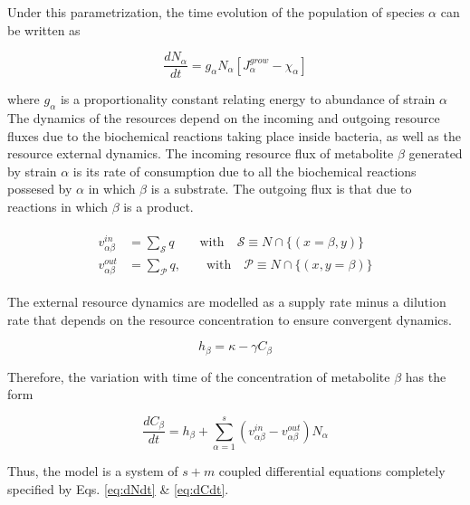 \documentclass[titlepage,11pt]{article}
\begin{document}
\begin{linenumbers}
\begin{singlespace}
				Under this parametrization, the time evolution of the population of species $ \alpha $ can be written as
				\begin{linenomath*}	
					\begin{equation}\label{eq:dNdt}
					\dfrac{dN_{\alpha}}{dt} = g_{\alpha}N_{\alpha}\left[J_{\alpha}^{grow}-\chi_{\alpha}\right] 
					\end{equation}
				\end{linenomath*}
				where $ g_{\alpha} $ is a proportionality constant relating energy to abundance of strain $ \alpha $\\
				The dynamics of the resources depend on the incoming and outgoing resource fluxes due to the biochemical reactions taking place inside bacteria, as well as the resource external dynamics. The incoming resource flux of metabolite $ \beta $  generated by strain $ \alpha $ is its rate of consumption due to all the biochemical reactions possesed by $ \alpha $ in which $ \beta $ is a substrate. The outgoing flux is that due to reactions in which $ \beta $ is a product.
				\begin{linenomath*}	
					\begin{align}
					\begin{split}
					v^{in}_{\alpha \beta} &= \sum_{\mathcal{S}} q   \qquad \textrm{with}  \quad  \mathcal{S} \equiv N \cap \{(x = \beta, y)\}\\
					v^{out}_{\alpha \beta} &= \sum_{\mathcal{P}} q , \qquad \textrm{with}  \quad  \mathcal{P} \equiv N \cap \{(x, y = \beta )\}
					\end{split}
					\end{align}
				\end{linenomath*}
				The external resource dynamics are modelled as a supply rate minus a dilution rate that depends on the resource concentration to ensure convergent dynamics. 
				\begin{linenomath*}	
					\begin{equation}
					h_{\beta}  =  \kappa - \gamma C_{\beta}
					\end{equation}
				\end{linenomath*}
				Therefore, the variation with time of the concentration of metabolite $ \beta $ has the form
				\begin{linenomath*}	
					\begin{equation}
					\dfrac{dC_{\beta}}{dt} = h_{\beta} + \sum_{{\alpha} = 1}^{s} \left(v_{{\alpha}\beta}^{in} -v_{{\alpha}\beta}^{out} \right)N_{\alpha} \label{eq:dCdt}
					\end{equation}
				\end{linenomath*}
				Thus, the model is a system of $ s + m $ coupled differential equations completely specified by Eqs. \ref{eq:dNdt} \& \ref{eq:dCdt}. \\
				

\end{singlespace}
\end{linenumbers}
\end{document}
